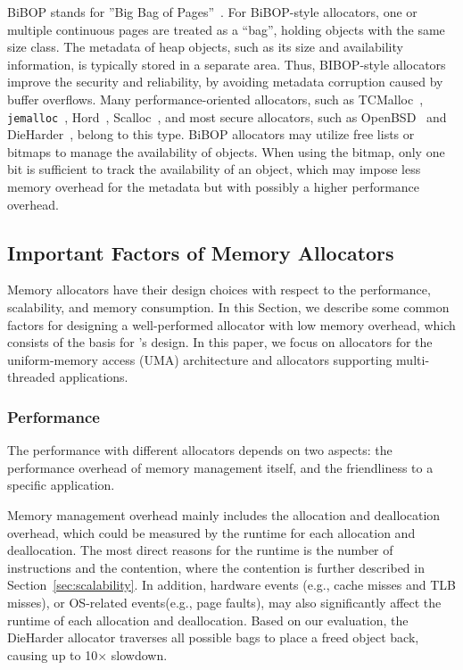 BiBOP stands for ''Big Bag of Pages''~\cite{hanson1980}. For BiBOP-style allocators, one or multiple continuous pages are treated as a ``bag'', holding objects with the same size class. The metadata of heap objects, such as its size and availability information, is typically stored in a separate area. Thus, BIBOP-style allocators improve the security and reliability, by avoiding metadata corruption caused by buffer overflows. Many performance-oriented allocators, such as TCMalloc~\cite{TCMalloc}, \texttt{jemalloc}~\cite{jemalloc}, Hord~\cite{Hoard}, Scalloc~\cite{Scalloc}, and most secure allocators, such as OpenBSD~\cite{OpenBSD} and DieHarder~\cite{DieHarder}, belong to this type. BiBOP allocators may utilize free lists or bitmaps to manage the availability of objects. When using the bitmap, only one bit is sufficient to track the availability of an object, which may impose less memory overhead for the metadata but with possibly a higher performance overhead.  


\subsection{Important Factors of Memory Allocators}

\label{sec:factors}

Memory allocators have their design choices with respect to the performance, scalability, and memory consumption. In this Section, we describe some common factors for designing a well-performed allocator with low memory overhead, which consists of the basis for \MP{}'s design. In this paper, we focus on allocators for the uniform-memory access (UMA) architecture and allocators supporting multi-threaded applications. 


\subsubsection{Performance}
\label{sec:performance}

The performance with different allocators depends on two aspects: the performance overhead of memory management itself, and the friendliness to a specific application. 

Memory management overhead mainly includes the allocation and deallocation overhead, which could be measured by the runtime for each allocation and deallocation. The most direct reasons for the runtime is the number of instructions and the contention, where the contention is further described in Section~\ref{sec:scalability}. In addition, hardware events (e.g., cache misses and TLB misses), or OS-related events(e.g., page faults), may also significantly affect the runtime of each allocation and deallocation. Based on our evaluation, the DieHarder allocator traverses all possible bags to place a freed object back, causing up to 10$\times$ slowdown. %


